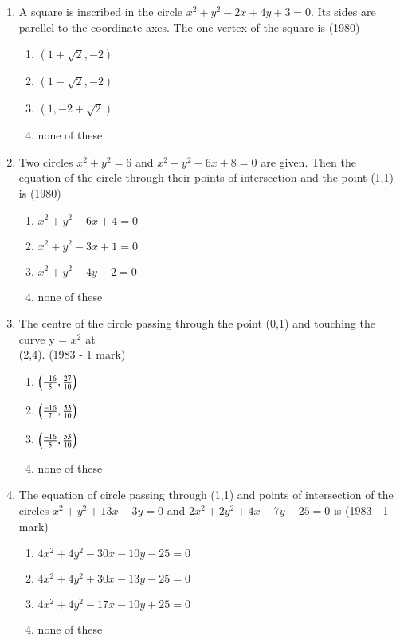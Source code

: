 \documentclass[journal,12pt,twocolumn]{IEEEtran}
\theoremstyle{remark}
\begin{document}
\begin{enumerate}
    \item A square is inscribed in the circle $x^{2} + y^{2} - 2x +4y +3= 0.$ Its sides are parellel to the coordinate axes. The one vertex of the square is \hfill {(1980)}
    \begin{enumerate}[label=(\alph*)]
    \item $(1+\sqrt{2}, -2)$ 
    \item $(1-\sqrt{2}, -2)$
    \item $(1, -2 +\sqrt{2})$
    \item none of these
    \end{enumerate}
    \item Two circles $x^{2} + y^{2} = 6$ and $x^{2} + y^{2}-6x +8=0$ are given. Then the equation of the circle through their points of intersection and the point (1,1) is \hfill {(1980)}
    \begin{enumerate}[label=(\alph*)]
    \item $x^{2}+y^{2}-6x+4=0$ 
    \item $x^{2}+y^{2}-3x+1=0$
    \item $x^{2}+y^{2}-4y+2=0$
    \item none of these
    \end{enumerate}
    \item The centre of the circle passing through the point (0,1) and touching the curve y = $x^{2}$ at \\ (2,4).
    \hfill {(1983 - 1 mark)}
    \begin{enumerate}[label=(\alph*)]
    \item $\left(\frac{-16}{5},\frac{27}{10}\right)$
    \item $\left(\frac{-16}{7},\frac{53}{10}\right)$
    \item $\left(\frac{-16}{5},\frac{53}{10}\right)$
    \item none of these
    \end{enumerate}
    \item The equation of circle passing through (1,1) and points of intersection of the circles $x^{2}+y^{2}+13x-3y=0$ and $2x^{2}+2y^{2}+4x-7y-25=0$ is
    \hfill {(1983 - 1 mark)}
    \begin{enumerate}[label=(\alph*)]
    \item $4x^{2}+4y^{2}-30x-10y-25=0$
    \item $4x^{2}+4y^{2}+30x-13y-25=0$
    \item $4x^{2}+4y^{2}-17x-10y+25=0$
    \item none of these

\end{enumerate}
\end{enumerate}
\end{document}
